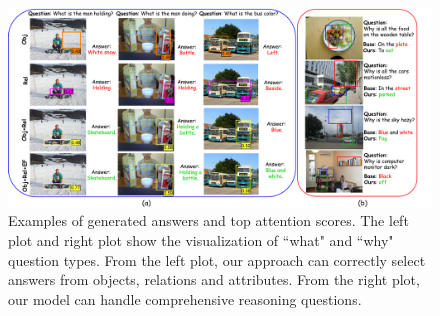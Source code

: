 \documentclass[letterpaper]{article} %
\begin{document}

\begin{figure}[ht] 
    \vspace{-0.5in}
    \centering 
    \includegraphics[width=1\textwidth]{./pic/visual_aaai2.pdf} 
    \caption{Examples of generated answers and top attention scores. The left plot and right plot show the visualization of ``what" and ``why" question types. From the left plot, our approach can correctly select answers from objects, relations and attributes. From the right plot, our model can handle comprehensive reasoning questions.} 
    \label{visual} 
    \vspace{-0.1in}
\end{figure}
\end{document}
